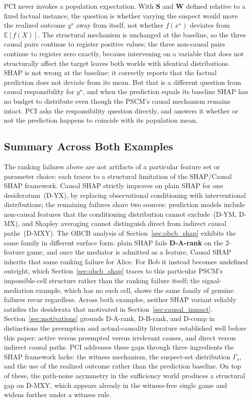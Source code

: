 PCI never invokes a population expectation. With $\mathbf{S}$ and $\mathbf{W}$
defined relative to a fixed factual instance, the question is whether varying
the suspect would move the realized outcome $y^\star$ away from itself,
not whether $f(x^\star)$ deviates from $\mathbb{E}[f(X)]$. The structural
mechanism is unchanged at the baseline, so the three causal pairs continue
to register positive values; the three non-causal pairs continue to register
zero exactly, because intervening on a variable that does not structurally
affect the target leaves both worlds with identical distributions.
SHAP is not wrong at the baseline: it correctly reports that the
factual prediction does not deviate from its mean. But that is a different
question from causal responsibility for $y^\star$, and when the prediction
equals its baseline SHAP has no budget to distribute even though the PSCM's
causal mechanism remains intact. PCI asks
the responsibility question directly, and answers it whether or not the
prediction happens to coincide with its population mean.

\subsection{Summary Across Both Examples}\label{sec:shap_summary}

The ranking failures above are not artifacts of a particular feature set or
parameter choice: each traces to a structural limitation of the SHAP/Causal
SHAP framework. Causal SHAP strictly improves on plain SHAP for one
desideratum~(D-YX), by replacing observational conditioning with
interventional distributions; the remaining failures share two sources:
prediction models include non-causal features that the conditioning
distribution cannot exclude~(D-YM, D-MX), and Shapley averaging cannot
distinguish direct from indirect causal paths~(D-MXY). The OBCB analysis of
Section~\ref{sec:obcb_shap} exhibits the same family in different surface
form: plain SHAP fails \textbf{D-A-rank} on the 2-feature game, and once the
mediator is admitted as a feature, Causal SHAP inherits that same ranking
failure for Alice. For Bob it instead becomes undefined outright, which
Section~\ref{sec:obcb_shap} traces to this particular PSCM's impossible-cell
structure rather than the ranking failure itself; the signal-mediation
example, which has no such cell, shows the same family of genuine failures
recur regardless. Across both examples,
neither SHAP variant reliably satisfies the desiderata that motivated
\Ourapproach in Section~\ref{sec:causal_impact}. Section~\ref{sec:motivations}
grounds D-A-rank, D-B-rank, and D-comp in distinctions the preemption and
actual-causality literature established well before this paper: active versus
preempted versus irrelevant causes, and direct versus indirect causal paths.
PCI addresses these gaps
through three ingredients the SHAP framework lacks: the
witness mechanism, the suspect-set distribution $\Gamma_s$, and the use of
the realized outcome rather than the prediction baseline. On top of these,
the path-noise asymmetry in the sufficiency world produces a structural gap on D-MXY,
which appears already in the witness-free single game and widens further under
a witness rule.

